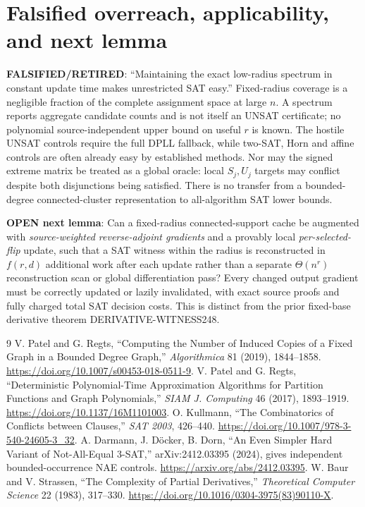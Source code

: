 \documentclass[11pt]{article}
\begin{document}
\section{Falsified overreach, applicability, and next lemma}
\textbf{FALSIFIED/RETIRED}: ``Maintaining the exact low-radius spectrum in constant update time makes unrestricted SAT easy.'' Fixed-radius coverage is a negligible fraction of the complete assignment space at large $n$. A spectrum reports aggregate candidate counts and is not itself an UNSAT certificate; no polynomial source-independent upper bound on useful $r$ is known. The hostile UNSAT controls require the full DPLL fallback, while two-SAT, Horn and affine controls are often already easy by established methods. Nor may the signed extreme matrix be treated as a global oracle: local $S_j,U_j$ targets may conflict despite both disjunctions being satisfied. There is no transfer from a bounded-degree connected-cluster representation to all-algorithm SAT lower bounds.

\textbf{OPEN next lemma}: Can a fixed-radius connected-support cache be augmented with \emph{source-weighted reverse-adjoint gradients} and a provably local \emph{per-selected-flip} update, such that a SAT witness within the radius is reconstructed in $f(r,d)$ additional work after each update rather than a separate $\Theta(n^r)$ reconstruction scan or global differentiation pass? Every changed output gradient must be correctly updated or lazily invalidated, with exact source proofs and fully charged total SAT decision costs. This is distinct from the prior fixed-base derivative theorem DERIVATIVE-WITNESS248.

\begin{thebibliography}{9}
 V. Patel and G. Regts, ``Computing the Number of Induced Copies of a Fixed Graph in a Bounded Degree Graph,'' \emph{Algorithmica} 81 (2019), 1844--1858. \url{https://doi.org/10.1007/s00453-018-0511-9}.
 V. Patel and G. Regts, ``Deterministic Polynomial-Time Approximation Algorithms for Partition Functions and Graph Polynomials,'' \emph{SIAM J. Computing} 46 (2017), 1893--1919. \url{https://doi.org/10.1137/16M1101003}.
 O. Kullmann, ``The Combinatorics of Conflicts between Clauses,'' \emph{SAT 2003}, 426--440. \url{https://doi.org/10.1007/978-3-540-24605-3_32}.
 A. Darmann, J. D\"ocker, B. Dorn, ``An Even Simpler Hard Variant of Not-All-Equal 3-SAT,'' arXiv:2412.03395 (2024), gives independent bounded-occurrence NAE controls. \url{https://arxiv.org/abs/2412.03395}.
 W. Baur and V. Strassen, ``The Complexity of Partial Derivatives,'' \emph{Theoretical Computer Science} 22 (1983), 317--330. \url{https://doi.org/10.1016/0304-3975(83)90110-X}.
\end{thebibliography}
\end{document}
